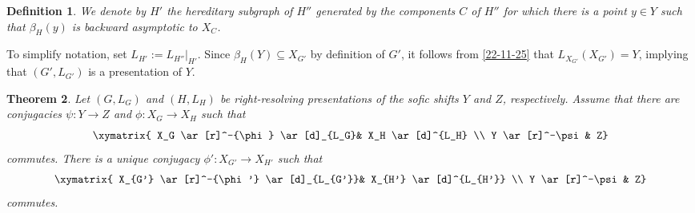 \documentclass[12pt,oneside,english]{amsart}
\newtheorem{thm}{Theorem}[section]
\newtheorem{definition}[thm]{Definition}
\begin{document}
\begin{definition}\label{30-10-25} We denote by $H'$ the hereditary subgraph of $H''$ generated by the components $C$ of $H''$ for which there is a point $y \in Y$ such that $\beta_H(y)$ is backward asymptotic to $X_C$. 
\end{definition}

To simplify notation, set $L_{H'} := L_{H''}|_{H'}$. Since $\beta_H(Y) \subseteq X_{G'}$ by definition of $G'$, it follows from \eqref{22-11-25} that $L_{X_{G'}}(X_{G'}) = Y$, implying that $(G',L_{G'})$ is a presentation of $Y$.





\begin{thm}\label{31-10-25hx} Let $(G,L_G)$ and $(H,L_H)$ be right-resolving presentations of the sofic shifts $Y$ and $Z$, respectively. Assume that there are conjugacies $\psi : Y \to Z$ and $\phi : X_G \to X_H$ such that 
\begin{equation*}\label{30-10-25bx}
\xymatrix{
 X_G \ar[r]^-{\phi} \ar[d]_{L_G}&  X_H \ar[d]^{L_H} \\
 Y  \ar[r]^-\psi & Z}
\end{equation*}
commutes. There is a unique conjugacy $\phi' : X_{G'} \to X_{H'}$ such that
\begin{equation*}\label{30-10-25cx}
\xymatrix{
 X_{G'} \ar[r]^-{\phi'} \ar[d]_{L_{G'}}&  X_{H'} \ar[d]^{L_{H'}} \\
Y   \ar[r]^-\psi & Z}
\end{equation*}
commutes.
\end{thm}
\end{document}
